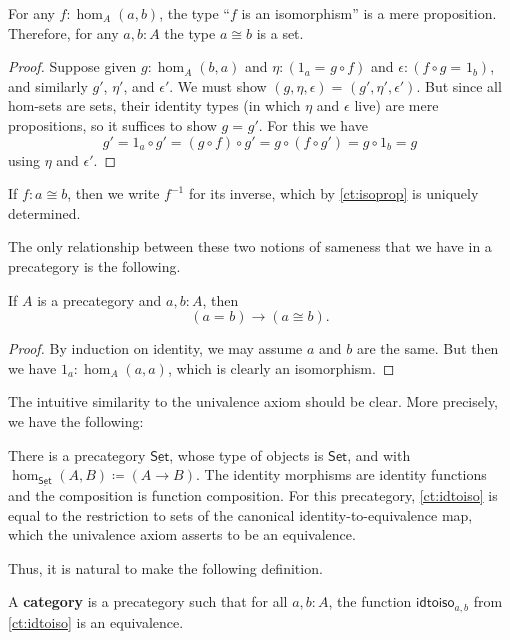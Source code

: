\documentclass{amsart}
\newcommand{\defeq}{\coloneqq}  %
\newcommand{\id}[3][]{\ensuremath{#2 =_{#1} #3}\xspace}
\renewcommand{\set}{\ensuremath{\mathsf{Set}}\xspace}
\newcommand{\uset}{\ensuremath{\underline{\set}}\xspace}
\theoremstyle{definition}
\theoremstyle{remark}
\numberwithin{equation}{section}
\newcommand{\inv}[1]{{#1}^{-1}}
\newcommand{\idtoiso}{\ensuremath{\mathsf{idtoiso}}\xspace}
\begin{document}
\begin{lem}\label{ct:isoprop}
  For any $f:\hom_A(a,b)$, the type ``$f$ is an isomorphism'' is a mere proposition.
  Therefore, for any $a,b:A$ the type $a\cong b$ is a set.
\end{lem}
\begin{proof}
  Suppose given $g:\hom_A(b,a)$ and $\eta:(\id{1_a}{g\circ f})$ and $\epsilon:(\id{f\circ g}{1_b})$, and similarly $g'$, $\eta'$, and $\epsilon'$.
We must show $\id{(g,\eta,\epsilon)}{(g',\eta',\epsilon')}$.
  But since all hom-sets are sets, their identity types (in which $\eta$ and $\epsilon$ live) are mere propositions, so it suffices to show $\id g {g'}$.
  For this we have
  \[g' = 1_a\circ g' = (g\circ f)\circ g' = g\circ (f\circ g') = g\circ 1_b = g\]
  using $\eta$ and $\epsilon'$.
\end{proof}

If $f:a\cong b$, then we write $\inv f$ for its inverse, which by \autoref{ct:isoprop} is uniquely determined.

The only relationship between these two notions of sameness that we have in a precategory is the following.

\begin{lem}\label{ct:idtoiso}
  If $A$ is a precategory and $a,b:A$, then
  \[(\id a b)\to (a \cong b).\]
\end{lem}
\begin{proof}
  By induction on identity, we may assume $a$ and $b$ are the same.
  But then we have $1_a:\hom_A(a,a)$, which is clearly an isomorphism.
\end{proof}

The intuitive similarity to the univalence axiom should be clear.
More precisely, we have the following:

\begin{eg}\label{ct:precatset}
  There is a precategory \uset, whose type of objects is \set, and with $\hom_{\uset}(A,B) \defeq (A\to B)$.
  The identity morphisms are identity functions and the composition is function composition.
  For this precategory, \autoref{ct:idtoiso} is equal to the restriction to sets of the canonical identity-to-equivalence map, which the univalence axiom asserts to be an equivalence.
\end{eg}

Thus, it is natural to make the following definition.

\begin{defn}\label{ct:category}
  A \textbf{category} is a precategory such that for all $a,b:A$, the function $\idtoiso_{a,b}$ from \autoref{ct:idtoiso} is an equivalence.
\end{defn}
\end{document}
